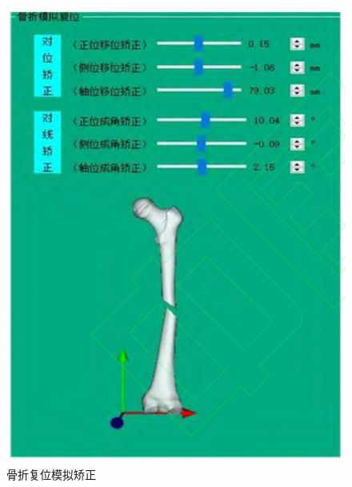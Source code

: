 \documentclass[notheorems, aspectratio=54]{beamer}
\begin{document}
\begin{frame}
\begin{columns}
\begin{figure}[htbp]
		\includegraphics[scale=0.5]{figure5.png}
		\caption{骨折复位模拟矫正}
		\label{figure 5}
	\end{figure}
    \end{columns}
\end{frame}
\end{document}
